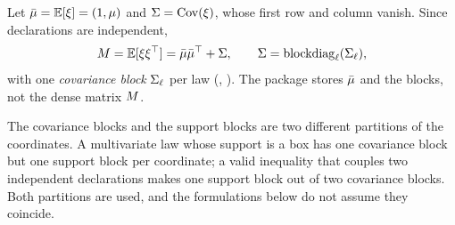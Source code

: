 Let $\bar\mu = \mathbb{E}[\xi] = (1, \mu)$ and $\Sigma = \operatorname{Cov}(\xi)$, whose first row and column vanish.
Since declarations are independent,
\begin{equation}
\label{eq:structured-moments}
M = \mathbb{E}[\xi\xi^\top] = \bar\mu\bar\mu^\top + \Sigma,
\qquad
\Sigma = \operatorname{blockdiag}_\ell(\Sigma_{\ell}),
\end{equation}
with one \emph{covariance block} $\Sigma_{\ell}$ per law (, ).
The package stores $\bar\mu$ and the blocks, not the dense matrix $M$.

The covariance blocks and the support blocks are two different partitions of the coordinates.
A multivariate law whose support is a box has one covariance block but one support block per coordinate;
a valid inequality that couples two independent declarations makes one support block out of two covariance blocks.
Both partitions are used, and the formulations below do not assume they coincide.
